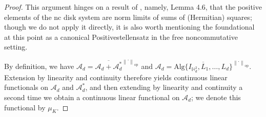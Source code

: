 \documentclass[11pt,reqno]{amsart}
\newcommand\norm[1]{\left\lVert#1\right\rVert}
\def\HH{\mathbb{H}}
\def\cA{\mathcal{A}}
\def\scrA{\mathscr{A}}
\theoremstyle{definition}
\numberwithin{equation}{section}
\begin{document}
\begin{proof}
    This argument hinges on a result of \cite{JM17}, namely, Lemma 4.6, that the positive elements of the nc disk system are norm limits of sums of (Hermitian) squares; though we do not apply it directly, it is also worth mentioning the foundational \cite{Hel02} at this point as a canonical Positivestellensatz in the free noncommutative setting.

    By definition, we have \(\scrA_d = \overline{\cA_d + \cA_d^*}^{\norm{\cdot}_{\mathrm{op}}}\) and \(\cA_d = \overline{\mathrm{Alg}\{ I_{\HH^2_d}, L_1, \ldots, L_d \}}^{\norm{\cdot}_{\mathrm{op}}}\). Extension by linearity and continuity therefore yields continuous linear functionals on \(\cA_d\) and \(\cA_d^*\), and then extending by linearity and continuity a second time we obtain a continuous linear functional on \(\scrA_d\); we denote this functional by \(\mu_K\).
    

\end{proof}
\end{document}
